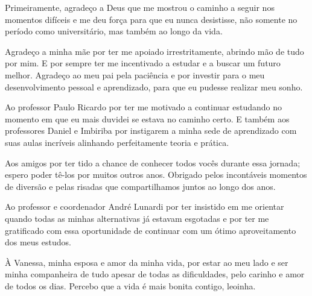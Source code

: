 Primeiramente, agradeço a Deus que me mostrou o caminho a seguir nos momentos difíceis e me deu força para que eu nunca desistisse, não somente no período como universitário, mas também ao longo da vida.

Agradeço a minha mãe por ter me apoiado irrestritamente, abrindo mão de tudo por mim. E por sempre ter me incentivado a estudar e a buscar um futuro melhor. Agradeço ao meu pai pela paciência e por investir para o meu desenvolvimento pessoal e aprendizado, para que eu pudesse realizar meu sonho.

Ao professor Paulo Ricardo por ter me motivado a continuar estudando no momento em que eu mais duvidei se estava no caminho certo. E também aos professores Daniel e Imbiriba por instigarem a minha sede de aprendizado com suas aulas incríveis alinhando perfeitamente teoria e prática. 

Aos amigos por ter tido a chance de conhecer todos vocês durante essa jornada; espero poder tê-los por muitos outros anos. Obrigado pelos incontáveis momentos de diversão e pelas risadas que compartilhamos juntos ao longo dos anos. 

Ao professor e coordenador André Lunardi por ter insistido em me orientar quando todas as minhas alternativas já estavam esgotadas e por ter me gratificado com essa oportunidade de continuar com um ótimo aproveitamento dos meus estudos.

À Vanessa, minha esposa e amor da minha vida, por estar ao meu lado e ser minha companheira de tudo apesar de todas as dificuldades, pelo carinho e amor de todos os dias. Percebo que a vida é mais bonita contigo, leoinha.